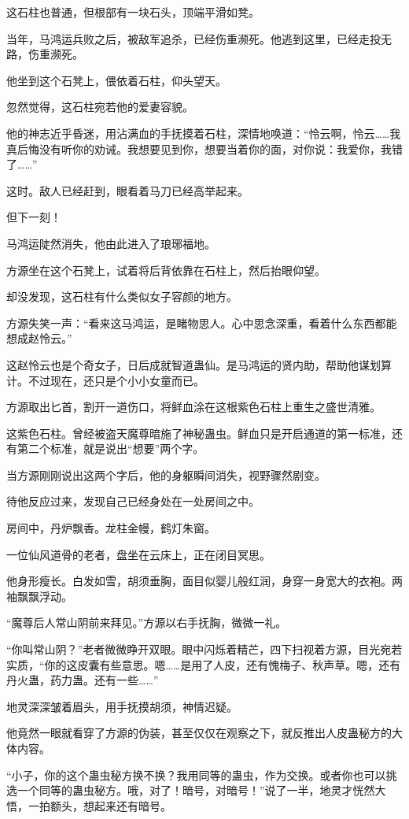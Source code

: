 \begin{this_body}
这石柱也普通，但根部有一块石头，顶端平滑如凳。

当年，马鸿运兵败之后，被敌军追杀，已经伤重濒死。他逃到这里，已经走投无路，伤重濒死。

他坐到这个石凳上，偎依着石柱，仰头望天。

忽然觉得，这石柱宛若他的爱妻容貌。

他的神志近乎昏迷，用沾满血的手抚摸着石柱，深情地唤道：“怜云啊，怜云……我真后悔没有听你的劝诫。我想要见到你，想要当着你的面，对你说：我爱你，我错了……”

这时。敌人已经赶到，眼看着马刀已经高举起来。

但下一刻！

马鸿运陡然消失，他由此进入了琅琊福地。

方源坐在这个石凳上，试着将后背依靠在石柱上，然后抬眼仰望。

却没发现，这石柱有什么类似女子容颜的地方。

方源失笑一声：“看来这马鸿运，是睹物思人。心中思念深重，看着什么东西都能想成赵怜云。”

这赵怜云也是个奇女子，日后成就智道蛊仙。是马鸿运的贤内助，帮助他谋划算计。不过现在，还只是个小小女童而已。

方源取出匕首，割开一道伤口，将鲜血涂在这根紫色石柱上重生之盛世清雅。

这紫色石柱。曾经被盗天魔尊暗施了神秘蛊虫。鲜血只是开启通道的第一标准，还有第二个标准，就是说出“想要”两个字。

当方源刚刚说出这两个字后，他的身躯瞬间消失，视野骤然剧变。

待他反应过来，发现自己已经身处在一处房间之中。

房间中，丹炉飘香。龙柱金幔，鹤灯朱窗。

一位仙风道骨的老者，盘坐在云床上，正在闭目冥思。

他身形瘦长。白发如雪，胡须垂胸，面目似婴儿般红润，身穿一身宽大的衣袍。两袖飘飘浮动。

“魔尊后人常山阴前来拜见。”方源以右手抚胸，微微一礼。

“你叫常山阴？”老者微微睁开双眼。眼中闪烁着精芒，四下扫视着方源，目光宛若实质，“你的这皮囊有些意思。嗯……是用了人皮，还有愧梅子、秋声草。嗯，还有丹火蛊，药力蛊。还有一些……”

地灵深深皱着眉头，用手抚摸胡须，神情迟疑。

他竟然一眼就看穿了方源的伪装，甚至仅仅在观察之下，就反推出人皮蛊秘方的大体内容。

“小子，你的这个蛊虫秘方换不换？我用同等的蛊虫，作为交换。或者你也可以挑选一个同等的蛊虫秘方。哦，对了！暗号，对暗号！”说了一半，地灵才恍然大悟，一拍额头，想起来还有暗号。


\end{this_body}
